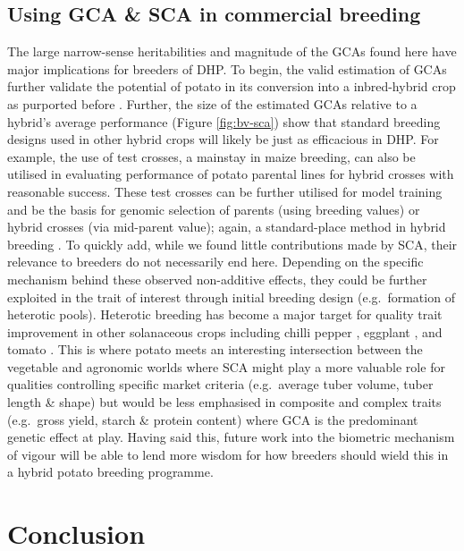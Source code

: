 \begin{refsection}
\subsection{Using GCA \& SCA in commercial breeding}\label{using-gca-sca-in-commercial-breeding}

The large narrow-sense heritabilities and magnitude of the GCAs found here have major implications for breeders of DHP. To begin, the valid estimation of GCAs further validate the potential of potato in its conversion into a inbred-hybrid crop as purported before \parencite{Jansky2016, Lindhout2011}. Further, the size of the estimated GCAs relative to a hybrid's average performance (Figure \ref{fig:bv-sca}) show that standard breeding designs used in other hybrid crops will likely be just as efficacious in DHP. For example, the use of test crosses, a mainstay in maize breeding, can also be utilised in evaluating performance of potato parental lines for hybrid crosses with reasonable success. These test crosses can be further utilised for model training and be the basis for genomic selection of parents (using breeding values) or hybrid crosses (via mid-parent value); again, a standard-place method in hybrid breeding \parencite{Albrecht2011}. To quickly add, while we found little contributions made by SCA, their relevance to breeders do not necessarily end here. Depending on the specific mechanism behind these observed non-additive effects, they could be further exploited in the trait of interest through initial breeding design (e.g.~formation of heterotic pools). Heterotic breeding has become a major target for quality trait improvement in other solanaceous crops including chilli pepper \parencite{Herath2020}, eggplant \parencite{Kumar2020}, and tomato \parencite{Pearson1983}. This is where potato meets an interesting intersection between the vegetable and agronomic worlds where SCA might play a more valuable role for qualities controlling specific market criteria (e.g.~average tuber volume, tuber length \& shape) but would be less emphasised in composite and complex traits (e.g.~gross yield, starch \& protein content) where GCA is the predominant genetic effect at play. Having said this, future work into the biometric mechanism of vigour will be able to lend more wisdom for how breeders should wield this in a hybrid potato breeding programme.



\section{Conclusion}\label{conclusion}


\end{refsection}
